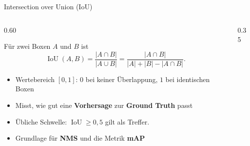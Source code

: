 \begin{frame}{Intersection over Union (IoU)}
\footnotesize
{}
\begin{columns}
\begin{column}{0.60\textwidth}
\begin{definition}
Für zwei Boxen $A$ und $B$ ist
\[
\operatorname{IoU}(A, B) = \frac{|A \cap B|}{|A \cup B|} = \frac{|A \cap B|}{|A| + |B| - |A \cap B|}.
\]
\end{definition}
\begin{itemize}
  \item Wertebereich $[0, 1]$: $0$ bei keiner Überlappung, $1$ bei identischen Boxen
  \item Misst, wie gut eine \textbf{Vorhersage} zur \textbf{Ground Truth} passt
  \item Übliche Schwelle: $\operatorname{IoU} \geq 0{,}5$ gilt als Treffer.
  \item Grundlage für \textbf{NMS} und die Metrik \textbf{mAP}
\end{itemize}
\end{column}
\begin{column}{0.35\textwidth}
\centering
{}
\end{column}
\end{columns}
\end{frame}


